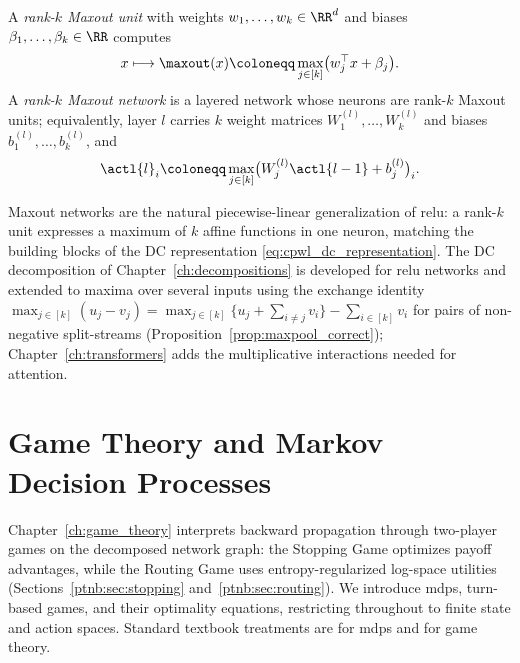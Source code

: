 \begin{definition}\label{def:maxout}
A \emph{rank-$k$ Maxout unit} with weights $w_1, \ldots, w_k \in \RR^{d}$ and biases $\beta_1, \ldots, \beta_k \in \RR$ computes
\begin{equation}
	x \longmapsto \maxout(x) \coloneqq \max_{j \in [k]} \bigl( w_j^{\top} x + \beta_j \bigr).
	\label{eq:maxout_unit}
\end{equation}
A \emph{rank-$k$ Maxout network} is a layered network whose neurons are rank-$k$ Maxout units; equivalently, layer $l$ carries $k$ weight matrices $W^{(l)}_1, \ldots, W^{(l)}_k$ and biases $b^{(l)}_1, \ldots, b^{(l)}_k$, and
\begin{equation}
	\actl{l}_i \coloneqq \max_{j \in [k]} \bigl( W^{(l)}_j \actl{l-1} + b^{(l)}_j \bigr)_i .
	\label{eq:maxout_layer}
\end{equation}
\end{definition}

\begin{remark}\label{rem:maxout_role}
Maxout networks are the natural piecewise-linear generalization of \ac{relu}: a rank-$k$ unit expresses a maximum of $k$ affine functions in one neuron, matching the building blocks of the DC representation \eqref{eq:cpwl_dc_representation}. The DC decomposition of Chapter~\ref{ch:decompositions} is developed for \ac{relu} networks and extended to maxima over several inputs using the exchange identity $\max_{j \in [k]}(u_j - v_j) = \max_{j \in [k]}\bigl\{ u_j + \sum_{i \ne j} v_i \bigr\} - \sum_{i \in [k]} v_i$ for pairs of non-negative split-streams (Proposition~\ref{prop:maxpool_correct}); Chapter~\ref{ch:transformers} adds the multiplicative interactions needed for attention.
\end{remark}

\section{Game Theory and Markov Decision Processes}\label{sec:game_theory_mdp_foundations}

Chapter~\ref{ch:game_theory} interprets backward propagation through two-player games on the decomposed network graph: the Stopping Game optimizes payoff advantages, while the Routing Game uses entropy-regularized log-space utilities (Sections~\ref{ptnb:sec:stopping} and~\ref{ptnb:sec:routing}). We introduce \acp{mdp}, turn-based games, and their optimality equations, restricting throughout to finite state and action spaces. Standard textbook treatments are \textcite{Puterman1994mdp} for \acp{mdp} and \textcite{OsborneRubinstein1994} for game theory.

